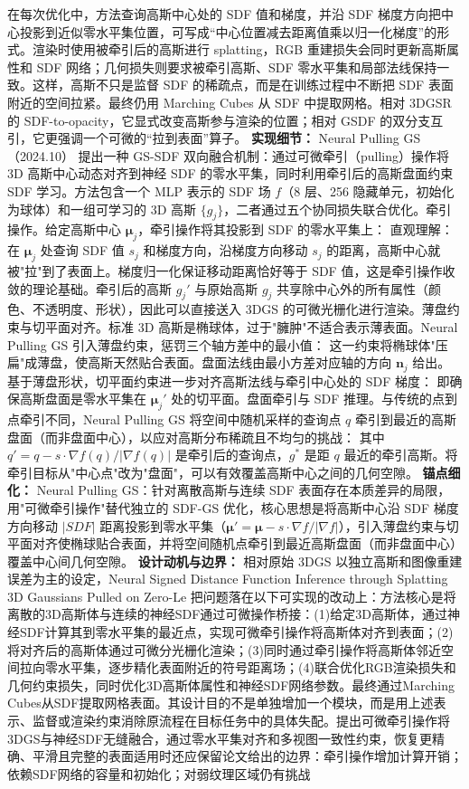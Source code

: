 在每次优化中，方法查询高斯中心处的 SDF 值和梯度，并沿 SDF 梯度方向把中心投影到近似零水平集位置，可写成“中心位置减去距离值乘以归一化梯度”的形式。渲染时使用被牵引后的高斯进行 splatting，RGB 重建损失会同时更新高斯属性和 SDF 网络；几何损失则要求被牵引高斯、SDF 零水平集和局部法线保持一致。这样，高斯不只是监督 SDF 的稀疏点，而是在训练过程中不断把 SDF 表面附近的空间拉紧。最终仍用 Marching Cubes 从 SDF 中提取网格。相对 3DGSR 的 SDF-to-opacity，它显式改变高斯参与渲染的位置；相对 GSDF 的双分支互引，它更强调一个可微的“拉到表面”算子。
\textbf{实现细节：} Neural Pulling GS（2024.10） 提出一种 GS-SDF 双向融合机制：通过可微牵引（pulling）操作将 3D 高斯中心动态对齐到神经 SDF 的零水平集，同时利用牵引后的高斯盘面约束 SDF 学习。方法包含一个 MLP 表示的 SDF 场 $f$（8 层、256 隐藏单元，初始化为球体）和一组可学习的 3D 高斯 $\{g_j\}$，二者通过五个协同损失联合优化。牵引操作。给定高斯中心 $\boldsymbol{\mu}_j$，牵引操作将其投影到 SDF 的零水平集上： 直观理解：在 $\boldsymbol{\mu}_j$ 处查询 SDF 值 $s_j$ 和梯度方向，沿梯度方向移动 $s_j$ 的距离，高斯中心就被"拉"到了表面上。梯度归一化保证移动距离恰好等于 SDF 值，这是牵引操作收敛的理论基础。牵引后的高斯 $g_j'$ 与原始高斯 $g_j$ 共享除中心外的所有属性（颜色、不透明度、形状），因此可以直接送入 3DGS 的可微光栅化进行渲染。薄盘约束与切平面对齐。标准 3D 高斯是椭球体，过于"臃肿"不适合表示薄表面。Neural Pulling GS 引入薄盘约束，惩罚三个轴方差中的最小值： 这一约束将椭球体"压扁"成薄盘，使高斯天然贴合表面。盘面法线由最小方差对应轴的方向 $\mathbf{n}_j$ 给出。基于薄盘形状，切平面约束进一步对齐高斯法线与牵引中心处的 SDF 梯度： 即确保高斯盘面是零水平集在 $\boldsymbol{\mu}_j'$ 处的切平面。盘面牵引与 SDF 推理。与传统的点到点牵引不同，Neural Pulling GS 将空间中随机采样的查询点 $q$ 牵引到最近的高斯盘面（而非盘面中心），以应对高斯分布稀疏且不均匀的挑战： 其中 $q'=q - s \cdot \nabla f(q)/|\nabla f(q)|$ 是牵引后的查询点，$g^{*}$ 是距 $q$ 最近的牵引高斯。将牵引目标从"中心点"改为"盘面"，可以有效覆盖高斯中心之间的几何空隙。
\textbf{锚点细化：} Neural Pulling GS：针对离散高斯与连续 SDF 表面存在本质差异的局限，用"可微牵引操作"替代独立的 SDF-GS 优化，核心思想是将高斯中心沿 SDF 梯度方向移动 $|SDF|$ 距离投影到零水平集（$\boldsymbol{\mu}' = \boldsymbol{\mu} - s \cdot \nabla f / |\nabla f|$），引入薄盘约束与切平面对齐使椭球贴合表面，并将空间随机点牵引到最近高斯盘面（而非盘面中心）覆盖中心间几何空隙。
\textbf{设计动机与边界：} 相对原始 3DGS 以独立高斯和图像重建误差为主的设定，Neural Signed Distance Function Inference through Splatting 3D Gaussians Pulled on Zero-Le 把问题落在以下可实现的改动上：方法核心是将离散的3D高斯体与连续的神经SDF通过可微操作桥接：(1)给定3D高斯体，通过神经SDF计算其到零水平集的最近点，实现可微牵引操作将高斯体对齐到表面；(2)将对齐后的高斯体通过可微分光栅化渲染；(3)同时通过牵引操作将高斯体邻近空间拉向零水平集，逐步精化表面附近的符号距离场；(4)联合优化RGB渲染损失和几何约束损失，同时优化3D高斯体属性和神经SDF网络参数。最终通过Marching Cubes从SDF提取网格表面。其设计目的不是单独增加一个模块，而是用上述表示、监督或渲染约束消除原流程在目标任务中的具体失配。提出可微牵引操作将3DGS与神经SDF无缝融合，通过零水平集对齐和多视图一致性约束，恢复更精确、平滑且完整的表面适用时还应保留论文给出的边界：牵引操作增加计算开销；依赖SDF网络的容量和初始化；对弱纹理区域仍有挑战
